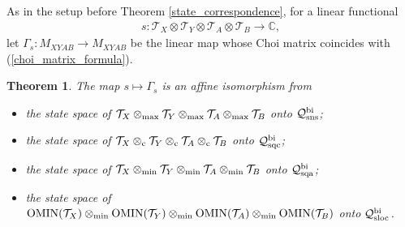 \documentclass[11pt]{amsart}
\newtheorem{theorem}{Theorem}[section]
\newcommand{\cl}[1]{\mathcal{#1}}
\newcommand{\bb}[1]{\mathbb{#1}}
\begin{document}
As in the setup before Theorem \ref{state_correspondence}, for a linear functional
\begin{gather*}
	s: \cl{T}_{X}\otimes \cl{T}_{Y}\otimes \cl{T}_{A}\otimes \cl{T}_{B}\rightarrow \bb{C},
\end{gather*}
\noindent let $\Gamma_{s}: M_{XYAB}\rightarrow M_{XYAB}$ be the linear map whose Choi matrix coincides with (\ref{choi_matrix_formula}). 
\begin{theorem}
The map $s \mapsto \Gamma_{s}$ is an affine isomorphism from
\begin{itemize}
	\item[(i)] the state space of $\cl{T}_{X}\otimes_{\rm max}\cl{T}_{Y}\otimes_{\rm max}\cl{T}_{A}\otimes_{\rm max}\cl{T}_{B}$ onto $\cl{Q}_{\rm sns}^{\rm bi}$;
	\item[(ii)] the state space of $\cl{T}_{X}\otimes_{\rm c}\cl{T}_{Y}\otimes_{\rm c} \cl{T}_{A}\otimes_{\rm c}\cl{T}_{B}$ onto $\cl{Q}_{\rm sqc}^{\rm bi}$;
	\item[(iii)] the state space of $\cl{T}_{X}\otimes_{\rm min}\cl{T}_{Y}\otimes_{\rm min}\cl{T}_{A}\otimes_{\rm min}\cl{T}_{B}$ onto $\cl{Q}_{\rm sqa}^{\rm bi}$;
	\item[(iv)] the state space of ${\rm OMIN}(\cl{T}_{X})\otimes_{\rm min} {\rm OMIN}(\cl{T}_{Y})\otimes_{\rm min} {\rm OMIN}(\cl{T}_{A})\otimes_{\rm min} {\rm OMIN}(\cl{T}_{B})$ onto $\cl{Q}_{\rm sloc}^{\rm bi}$.
\end{itemize}
\end{theorem}
\end{document}
